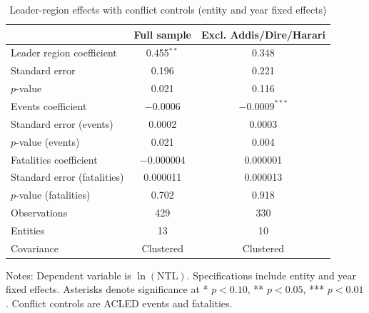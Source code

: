 \begin{table}[ht]
\centering
\caption{Leader-region effects with conflict controls (entity and year fixed effects)}
\begin{tabular}{lcc}
\toprule
 & Full sample & Excl. Addis/Dire/Harari \\
\midrule
Leader region coefficient & 0.455$^{**}$ & 0.348 \\
Standard error & 0.196 & 0.221 \\
$p$-value & 0.021 & 0.116 \\
Events coefficient & $-0.0006$ & $-0.0009^{***}$ \\
Standard error (events) & 0.0002 & 0.0003 \\
$p$-value (events) & 0.021 & 0.004 \\
Fatalities coefficient & $-0.000004$ & 0.000001 \\
Standard error (fatalities) & 0.000011 & 0.000013 \\
$p$-value (fatalities) & 0.702 & 0.918 \\
Observations & 429 & 330 \\
Entities & 13 & 10 \\
Covariance & Clustered & Clustered \\
\bottomrule
\end{tabular}
\vspace{4pt}
{\footnotesize Notes: Dependent variable is $\ln(\mathrm{NTL})$. Specifications include entity and year fixed effects. Asterisks denote significance at * $p<0.10$, ** $p<0.05$, *** $p<0.01$. Conflict controls are ACLED events and fatalities.}
\label{tab:panel_conflict}
\end{table}
